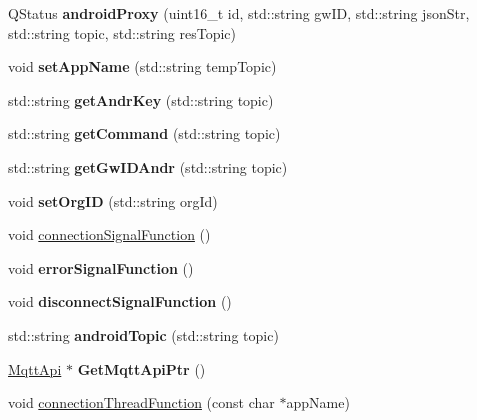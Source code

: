\begin{DoxyCompactItemize}
\item 
Q\+Status {\bfseries android\+Proxy} (uint16\+\_\+t id, std\+::string gw\+ID, std\+::string json\+Str, std\+::string topic, std\+::string res\+Topic)\hypertarget{classmqttBusObject_aaadc1efda038b8c185973931fe0cba0f}{}\label{classmqttBusObject_aaadc1efda038b8c185973931fe0cba0f}

\item 
void {\bfseries set\+App\+Name} (std\+::string temp\+Topic)\hypertarget{classmqttBusObject_a87a21ea77d4dc350915005ed50e78b96}{}\label{classmqttBusObject_a87a21ea77d4dc350915005ed50e78b96}

\item 
std\+::string {\bfseries get\+Andr\+Key} (std\+::string topic)\hypertarget{classmqttBusObject_ab29e7b43f39fbe3ca64458b2547b9f41}{}\label{classmqttBusObject_ab29e7b43f39fbe3ca64458b2547b9f41}

\item 
std\+::string {\bfseries get\+Command} (std\+::string topic)\hypertarget{classmqttBusObject_a68b3a218ee433aff564841ec6363ea34}{}\label{classmqttBusObject_a68b3a218ee433aff564841ec6363ea34}

\item 
std\+::string {\bfseries get\+Gw\+I\+D\+Andr} (std\+::string topic)\hypertarget{classmqttBusObject_accc0f57dfd1979dea6155013b02259f1}{}\label{classmqttBusObject_accc0f57dfd1979dea6155013b02259f1}

\item 
void {\bfseries set\+Org\+ID} (std\+::string org\+Id)\hypertarget{classmqttBusObject_a7ff5eae0237b188ed036509dbbb4cfd9}{}\label{classmqttBusObject_a7ff5eae0237b188ed036509dbbb4cfd9}

\item 
void \hyperlink{classmqttBusObject_abef9598788ba1f757a6fb88664b6601f}{connection\+Signal\+Function} ()
\item 
void {\bfseries error\+Signal\+Function} ()\hypertarget{classmqttBusObject_aa6736a581db8c961ae2dfd3bfcb32dcf}{}\label{classmqttBusObject_aa6736a581db8c961ae2dfd3bfcb32dcf}

\item 
void {\bfseries disconnect\+Signal\+Function} ()\hypertarget{classmqttBusObject_a9a68c8f7c6fce4b6d8d1cdd5b439270e}{}\label{classmqttBusObject_a9a68c8f7c6fce4b6d8d1cdd5b439270e}

\item 
std\+::string {\bfseries android\+Topic} (std\+::string topic)\hypertarget{classmqttBusObject_af01485d39f0f2d10ac3dbdf9be41e5f8}{}\label{classmqttBusObject_af01485d39f0f2d10ac3dbdf9be41e5f8}

\item 
\hyperlink{classMqttApi}{Mqtt\+Api} $\ast$ {\bfseries Get\+Mqtt\+Api\+Ptr} ()\hypertarget{classmqttBusObject_af87e9164d5f6b64fc094faac01379db5}{}\label{classmqttBusObject_af87e9164d5f6b64fc094faac01379db5}

\item 
void \hyperlink{classmqttBusObject_a44e14e25f38593ffd88dc60b975d3bb5}{connection\+Thread\+Function} (const char $\ast$app\+Name)
\end{DoxyCompactItemize}
